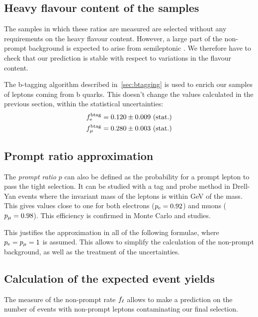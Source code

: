 \subsection{Heavy flavour content of the samples}
The samples in which these ratios are measured are selected without any
requirements on the heavy flavour content. However, a large part of the
non-prompt background is expected to arise from semileptonic \ttbar. We
therefore have to check that our prediction is stable with respect to
variations in the flavour content.

The b-tagging algorithm described in~\ref{sec:btagging} is used to enrich
our samples of leptons coming from b quarks. This doesn't change the values
calculated in the previous section, within the statistical uncertainties:
\begin{align*}
    f_{\mathrm{e}}^{\text{btag}} &= 0.120 \pm 0.009 \text{ (stat.)}\\
    f_{\mu}^{\text{btag}} &= 0.280 \pm 0.003 \text{ (stat.)}
\end{align*}

\subsection{Prompt ratio approximation}
The \emph{prompt ratio} $p$ can also be defined as the probability for
a prompt lepton to pass the tight selection. It can be studied with a tag
and probe method in Drell-Yan events where the invariant mass of the leptons
is within \unit[10]{GeV} of the \Z mass. This gives values close to one for
both electrons ($p_{\mathrm{e}} = 0.92$) and muons ($p_{\mu} = 0.98$). This efficiency is
confirmed in Monte Carlo \Z and \W studies.

This justifies the approximation in all of the following formulae, where
$p_{\mathrm{e}} = p_{\mu} = 1$ is assumed.
This allows to simplify the calculation of the non-prompt background, as
well as the treatment of the uncertainties.

\subsection{Calculation of the expected event
yields}\label{sec:fake_prediction}
The measure of the non-prompt rate $f_{\mathrm{\ell}}$ allows to make a prediction on
the number of events with non-prompt leptons contaminating our final
selection.

